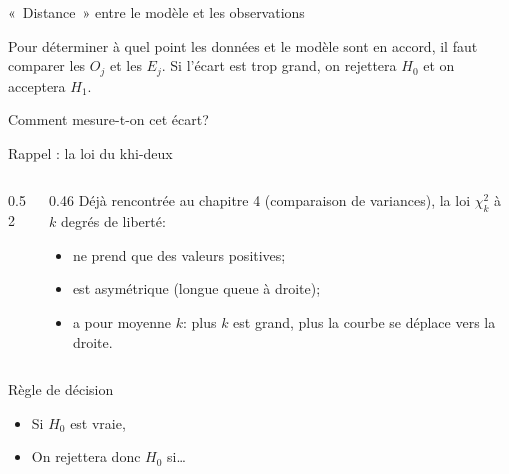 \documentclass{BeamerTemplate}
\begin{document}
\begin{frame}[t]{«~Distance~» entre le modèle et les observations}

Pour déterminer à quel point les données et le modèle sont en accord, il faut
comparer les $O_j$ et les $E_j$. Si l'écart est trop grand, on rejettera $H_0$
et on acceptera $H_1$.

\bigskip
\alert{Comment mesure-t-on cet écart?}

\vspace{3cm}

\end{frame}

\begin{frame}[t]{Rappel : la loi du khi-deux}

\begin{columns}[T]
\begin{column}{0.52\textwidth}
\end{column}
\begin{column}{0.46\textwidth}
\small
Déjà rencontrée au chapitre 4 (comparaison de variances), la loi $\chi^2_k$ à $k$
\alert{degrés de liberté}:
\begin{itemize}\itemsep2mm
  \item ne prend que des valeurs \alert{positives};
  \item est \alert{asymétrique} (longue queue à droite);
  \item a pour moyenne $k$: plus $k$ est grand, plus la courbe se déplace
  vers la droite.
\end{itemize}
\end{column}
\end{columns}

\end{frame}

\begin{frame}[t]{Règle de décision}

\begin{itemize}\itemsep3cm
  \item Si $H_0$ est vraie,
  \item On rejettera donc $H_0$ si\ldots
\end{itemize}

\end{frame}
\end{document}
